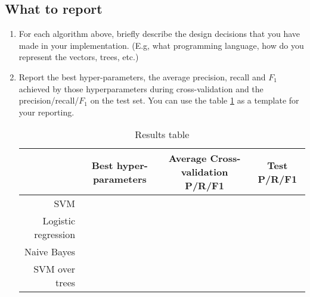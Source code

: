 \subsection{What to report}

\begin{enumerate}
\item For each algorithm above, briefly describe the design decisions
  that you have made in your implementation. (E.g, what programming
  language, how do you represent the vectors, trees, etc.)

\item Report the best hyper-parameters, the average precision,
  recall and $F_1$ achieved by those hyperparameters during
  cross-validation and the precision/recall/$F_1$ on the test
  set. You can use the table \ref{tb} as a template for your reporting.

  \begin{table}[]
    \centering
    \scriptsize
    \begin{tabular}{rccc}
      \toprule 
                          & Best hyper-parameters & Average Cross-validation P/R/F1 & Test P/R/F1 \\\midrule
      SVM                 &                       &                                 &             \\
      Logistic regression &                       &                                 &             \\
      Naive Bayes         &                       &                                 &             \\
      SVM over trees      &                       &                                 &             \\
      \bottomrule
    \end{tabular}
    \caption{Results table}\label{tb}
  \end{table}
\end{enumerate}

